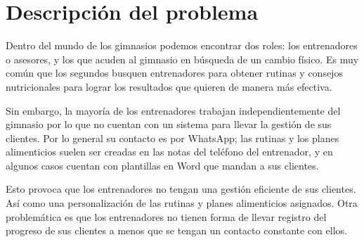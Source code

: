 
\section*{Descripción del problema}

Dentro del mundo de los gimnasios podemos encontrar dos roles: los entrenadores o asesores, y los que acuden al gimnasio en búsqueda de un cambio físico. Es muy común que los segundos busquen entrenadores para obtener rutinas y consejos nutricionales para lograr los resultados que quieren de manera más efectiva. 

Sin embargo, la mayoría de los entrenadores trabajan independientemente del gimnasio por lo que no cuentan con un sistema para llevar la gestión de sus clientes. Por lo general su contacto es por WhatsApp; las rutinas y los planes alimenticios suelen ser creadas en las notas del teléfono del entrenador, y en algunos casos cuentan con plantillas en Word que mandan a sus clientes. 

Esto provoca que los entrenadores no tengan una gestión eficiente de sus clientes. Así como una personalización de las rutinas y planes alimenticios asignados. Otra problemática es que los entrenadores no tienen forma de llevar registro del progreso de sus clientes a menos que se tengan un contacto constante con ellos.